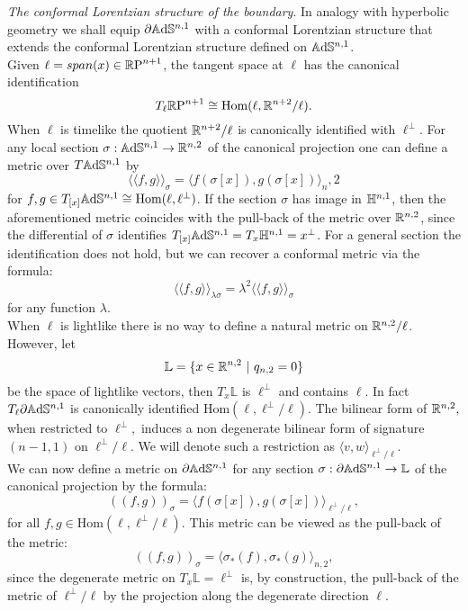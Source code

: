 \textit{The conformal Lorentzian structure of the boundary}.
In analogy with hyperbolic geometry we shall equip $\partial \mathbb{A}\mathrm{d}\mathbb{S}^{n,1}$ with a conformal Lorentzian structure that extends the conformal Lorentzian structure defined on $\mathbb{A}\mathrm{d}\mathbb{S}^{n,1}$.\\
Given $\ell= span(x) \in \mathbb{R} \text{P}^{n+1}$, the tangent space at $\ell$ has the canonical identification
\[
    T_{\ell}\mathbb{R}\text{P}^{n+1} \cong \text{Hom}(\ell,\mathbb{R}^{n+2}/\ell).
\]
When $\ell$ is timelike the quotient $\mathbb{R}^{n+2}/\ell$ is canonically identified with $\ell^\perp$. For any local section $\sigma : \mathbb{A}\mathrm{d}\mathbb{S}^{n,1} \to \mathbb{R}^{n,2}$ of the canonical projection one can define a metric over $T\mathbb{A}\mathrm{d}\mathbb{S}^{n,1}$ by
\[
    \langle \langle f,g \rangle \rangle_\sigma = \langle f(\sigma[x]),g(\sigma[x]) \rangle_n,2
\]
for $f,g \in T_{[x]}\mathbb{A}\mathrm{d}\mathbb{S}^{n,1} \cong \text{Hom}(\ell,\ell^\perp)$.
If the section $\sigma$ has image in $\mathbb{H}^{n,1}$, then the aforementioned metric coincides with the pull-back of the metric over $\mathbb{R}^{n,2}$, since the differential of $\sigma $ identifies $T_{[x]}\mathbb{A}\mathrm{d}\mathbb{S}^{n,1}=T_x\mathbb{H}^{n,1}=x^\perp$. For a general section the identification does not hold, but we can recover a conformal metric via the formula: 
\[
    \langle \langle f,g \rangle \rangle_{\lambda\sigma}=\lambda^2\langle \langle f,g \rangle \rangle_{\sigma}
\]
for any function $\lambda$.\\
When $\ell$ is lightlike there is no way to define a natural metric on $\mathbb{R}^{n,2}/\ell$. However, let
\[
    \mathbb{L} = \{ x\in\mathbb{R}^{n,2} \ | \ q_{n,2}=0 \}
\]
be the space of lightlike vectors, then $T_x \mathbb{L}$ is $\ell^\perp$ and contains $\ell$.
In fact $T_\ell \partial\mathbb{A}\mathrm{d}\mathbb{S}^{n,1}$ is canonically identified $\text{Hom}(\ell, \ell^\perp / \ell)$. 
The bilinear form of $\mathbb{R}^{n,2},$ when restricted to $\ell^{\perp},$ induces a non degenerate bilinear form of signature $(n-1,1)$ on $\ell^\perp/\ell.$
We will denote such a restriction as $\langle v,w\rangle_{\ell^{\perp}/\ell}.$ \\
We can now define a metric on $\partial\mathbb{A}\mathrm{d}\mathbb{S}^{n,1}$ for any section $\sigma:\partial\mathbb{A}\mathrm{d}\mathbb{S}^{n,1}\to \mathbb{L}$ of the canonical projection by the formula:
\[
    ((f,g))_{\sigma}=\langle f(\sigma[x]),g(\sigma[x])\rangle_{\ell^{\perp}/\ell},
\]
for all $f,g\in \text{Hom}(\ell, \ell^\perp/\ell).$ This metric can be viewed as the pull-back of the metric: 
\[
    ((f,g))_\sigma=\langle \sigma_*(f), \sigma_{\ast} (g)\rangle_{n,2},
\] 
since the degenerate metric on $T_x\mathbb{L}=\ell^\perp$ is, by construction, the pull-back of the metric of $\ell^{\perp}/\ell$ by the projection along the degenerate direction $\ell$.\\ 
